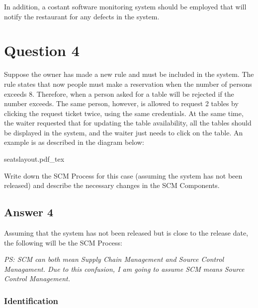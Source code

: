 \documentclass[
  11pt, %
]{assignment}
\begin{document}
In addition, a costant software monitoring system should be employed that will notify the restaurant for any defects in the system.

\section*{Question 4}
\begin{problem}
Suppose the owner has made a new rule and must be included in the system. The rule states that now people must make a reservation when the number of persons exceeds 8. Therefore, when a person asked for a table will be rejected if the number exceeds. The same person, however, is allowed to request 2 tables by clicking the request ticket twice, using the same credentials. At the same time, the waiter requested that for updating the table availability, all the tables should be displayed in the system, and the waiter just needs to click on the table. An example is as described in the diagram below:

\medskip


\medskip

\begin{center}
  {seatslayout.pdf_tex}
\end{center}

\medskip

Write down the SCM Process for this case (assuming the system has not been released) and describe the necessary changes in the SCM Components.

\end{problem}

\subsection*{Answer 4}

Assuming that the system has not been released but is close to the release date, the following will be the SCM Process:

\textit{PS\@: SCM can both mean Supply Chain Management and Source Control Managament. Due to this confusion, I am going to assume SCM means Source Control Management.}

\subsubsection*{Identification}
\end{document}
